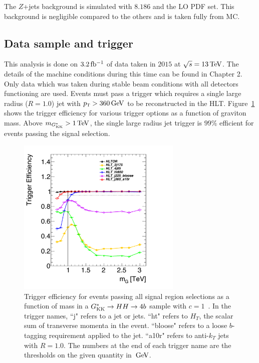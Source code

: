 The $Z$+jets background is simulated with \PYTHIA $8.186$ and the  LO PDF set. This background is negligible compared to the others and is taken fully from MC. 

\subsection{Data sample and trigger}

This analysis is done on $3.2 \mbox{\,fb$^{-1}$}$ of data taken in $2015$ at $\sqrt{s} = 13 \TeV$. The details of the machine conditions during this time can be found in Chapter 2. Only data which was taken during stable beam conditions with all detectors functioning are used. Events must pass a trigger which requires a single large radius ($R=1.0$) jet with $\pT > 360 \GeV$ to be reconstructed in the HLT. Figure~\ref{fig:trig_eff_4b} shows the trigger efficiency for various trigger options as a function of graviton mass. Above $m_{\Gkk} > 1 \TeV$, the single large radius jet trigger is $99\%$ efficient for events passing the signal selection. 

\begin{figure}[h!]
  \centering
  \captionsetup{justification=centering}

  \includegraphics[width=0.7\textwidth]{figures/PassSignal_HLTeff}
  \caption{Trigger efficiency for events passing all signal region selections as a function of mass in a $G^*_{\rm KK} \to HH \to 4b$ sample with $c = 1$~\cite{Tony}. In the trigger names, ``j" refers to a jet or jets. ``ht" refers to $H_{T}$, the scalar sum of transverse momenta in the event. ``bloose" refers to a loose $b$-tagging requirement applied to the jet. ``a10r" refers to anti-$k_{T}$ jets with $R = 1.0$. The numbers at the end of each trigger name are the thresholds on the given quantity in $\GeV$.}
  \label{fig:trig_eff_4b}
\end{figure}

